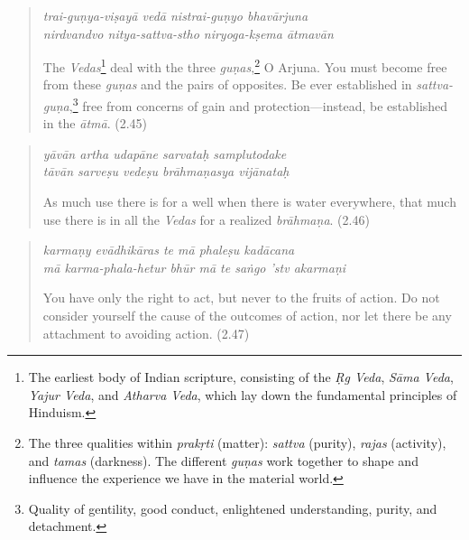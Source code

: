 \documentclass[12pt, twoside, openright]{memoir}
\begin{document}
\par
\begin{verse}
\textit{trai-guṇya-viṣayā vedā nistrai-guṇyo bhavārjuna} \\
\textit{nirdvandvo nitya-sattva-stho niryoga-kṣema ātmavān}

\noindent The \textit{Vedas}\footnote{The earliest body of Indian scripture, consisting of the \textit{Ṛg Veda}, \textit{Sāma Veda}, \textit{Yajur Veda}, and \textit{Atharva Veda}, which lay down the fundamental principles of Hinduism.} deal with the three \textit{guṇas},\footnote{The three qualities within \textit{prakṛti} (matter): \textit{sattva} (purity), \textit{rajas} (activity), and \textit{tamas} (darkness). The different \textit{guṇas} work together to shape and influence the experience we have in the material world.} O Arjuna. You must become free from these \textit{guṇas} and the pairs of opposites. Be ever established in \textit{sattva-guṇa},\footnote{Quality of gentility, good conduct, enlightened understanding, purity, and detachment.} free from concerns of gain and protection---instead, be established in the \textit{ātmā}. (2.45)
\end{verse}
\par



\par
\begin{verse}
\textit{yāvān artha udapāne sarvataḥ samplutodake} \\
\textit{tāvān sarveṣu vedeṣu brāhmaṇasya vijānataḥ}

\noindent As much use there is for a well when there is water everywhere, that much use there is in all the \textit{Vedas} for a realized \textit{brāhmaṇa}. (2.46)
\end{verse}
\par



\par
\begin{verse}
\textit{karmaṇy evādhikāras te mā phaleṣu kadācana} \\
\textit{mā karma-phala-hetur bhūr mā te saṅgo ’stv akarmaṇi}

\noindent You have only the right to act, but never to the fruits of action. Do not consider yourself the cause of the outcomes of action, nor let there be any attachment to avoiding action. (2.47)
\end{verse}
\par
\end{document}
